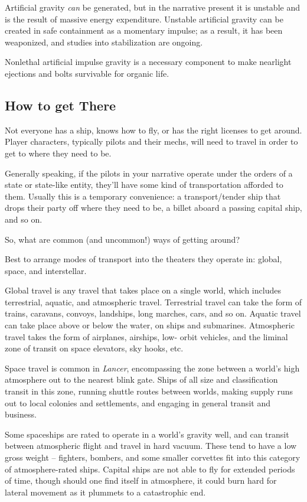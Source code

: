 Artificial gravity \textit{can} be generated, but in the narrative present it is unstable and is the result of
massive energy expenditure. Unstable artificial gravity can be created in safe containment as a
momentary impulse; as a result, it has been weaponized, and studies into stabilization are
ongoing.

Nonlethal artificial impulse gravity is a necessary component to make nearlight ejections and
bolts survivable for organic life.

\subsection{How to get There}

Not everyone has a ship, knows how to fly, or has the right licenses to get around. Player
characters, typically pilots and their mechs, will need to travel in order to get to where they need
to be.

Generally speaking, if the pilots in your narrative operate under the orders of a state or state-like
entity, they’ll have some kind of transportation afforded to them. Usually this is a temporary
convenience: a transport/tender ship that drops their party off where they need to be, a billet
aboard a passing capital ship, and so on.

So, what are common (and uncommon!) ways of getting around?

Best to arrange modes of transport into the theaters they operate in: global, space, and
interstellar.

Global travel is any travel that takes place on a single world, which includes terrestrial, aquatic,
and atmospheric travel. Terrestrial travel can take the form of trains, caravans, convoys,
landships, long marches, cars, and so on. Aquatic travel can take place above or below the
water, on ships and submarines. Atmospheric travel takes the form of airplanes, airships, low-
orbit vehicles, and the liminal zone of transit on space elevators, sky hooks, etc.

Space travel is common in \textit{Lancer}, encompassing the zone between a world’s high atmosphere
out to the nearest blink gate. Ships of all size and classification transit in this zone, running
shuttle routes between worlds, making supply runs out to local colonies and settlements, and
engaging in general transit and business.

Some spaceships are rated to operate in a world’s gravity well, and can transit between
atmospheric flight and travel in hard vacuum. These tend to have a low gross weight --  fighters,
bombers, and some smaller corvettes fit into this category of atmosphere-rated ships. Capital
ships are not able to fly for extended periods of time, though should one find itself in
atmosphere, it could burn hard for lateral movement as it plummets to a catastrophic end.


